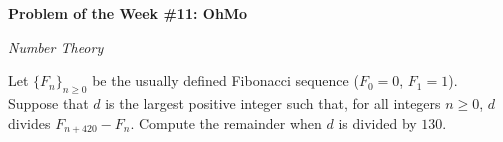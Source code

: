 \begin{potw}\vspace{5pt}
{\large\textbf{Problem of the Week \#11: OhMo}}\vspace{5pt}

\textit{Number Theory}\V

Let $\{F_n\}_{n\geq 0}$ be the usually defined Fibonacci sequence ($F_0=0$, $F_1=1$). Suppose that $d$ is the largest positive integer such that, for all integers $n\geq 0$, $d$ divides $F_{n+420}-F_n$. Compute the remainder when $d$ is divided by $130$.
\end{potw}\V
